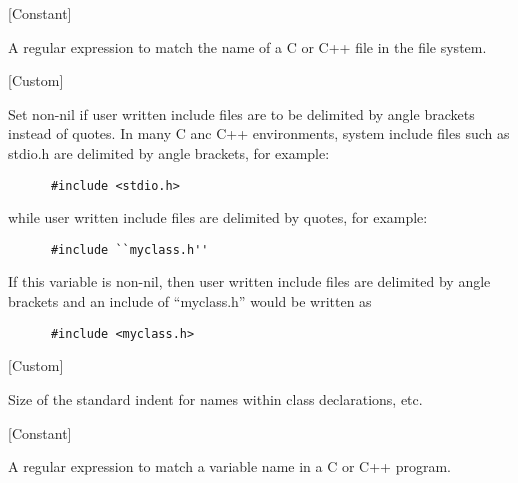 \vspace{1em}
\noindent
{}
\usebox{\funcname}
 \hfill [Constant]

\begin{doc-string}
A regular expression to match the name of a C or C++ file in the file system.
\end{doc-string}

\vspace{1em}
\noindent
{}
\usebox{\funcname}
 \hfill [Custom]

\begin{doc-string}
Set non-nil if user written include files are to be delimited by
angle brackets instead of quotes.
In many C anc C++ environments, system include files such as stdio.h are delimited
by angle brackets, for example:

\begin{verbatim}
      #include <stdio.h>
\end{verbatim}

while user written include files are delimited by quotes, for example:

\begin{verbatim}
      #include ``myclass.h''
\end{verbatim}

If this variable is non-nil, then user written include files are delimited
by angle brackets and an include of ``myclass.h'' would be written as

\begin{verbatim}
      #include <myclass.h>
\end{verbatim}
\end{doc-string}

\vspace{1em}
\noindent
{}
\usebox{\funcname}
 \hfill [Custom]

\begin{doc-string}
Size of the standard indent for names within class declarations, etc.
\end{doc-string}

\vspace{1em}
\noindent
{}
\usebox{\funcname}
 \hfill [Constant]

\begin{doc-string}
A regular expression to match a variable name in a C or C++ program.
\end{doc-string}

